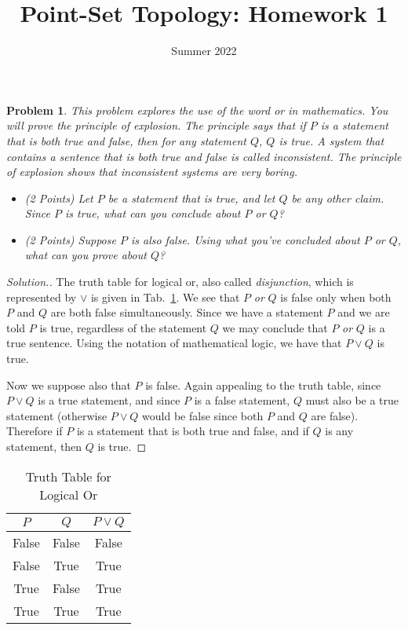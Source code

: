 \documentclass{article}
\title{Point-Set Topology: Homework 1}
\date{Summer 2022}
\theoremstyle{normal}
\newtheorem{problem}{Problem}
\begin{document}
    \maketitle
    \color{blue}
    \begin{problem}
        This problem explores the use of the word \textit{or} in mathematics.
        You will prove the \textit{principle of explosion}. The principle says
        that if $P$ is a statement that is both true and false, then for any
        statement $Q$, $Q$ is true. A system that contains a sentence that is
        both true and false is called \textit{inconsistent}. The principle of
        explosion shows that inconsistent systems are very boring.
        \begin{itemize}
            \item (2 Points) Let $P$ be a statement that is true, and let $Q$
                be any other claim. Since $P$ is true, what can you conclude
                about $P$ \textit{or} $Q$?
            \item (2 Points) Suppose $P$ is also false. Using what you've
                concluded about $P$ \textit{or} $Q$, what can you prove about
                $Q$?
        \end{itemize}
    \end{problem}
    \color{black}
    \begin{proof}[Solution.]
        The truth table for logical or, also called \textit{disjunction},
        which is represented by $\lor$ is given in
        Tab.~\ref{tab:logical_or}. We see that
        $P$ \textit{or} $Q$ is false only when both $P$ and $Q$ are both
        false simultaneously. Since we have a statement $P$ and we are told
        $P$ is true, regardless of the statement $Q$ we may conclude that
        $P$ \textit{or} $Q$ is a true sentence. Using the notation of
        mathematical logic, we have that $P\lor{Q}$ is true.
        \par\hfill\par
        Now we suppose also that $P$ is false. Again appealing to the truth
        table, since $P\lor{Q}$ is a true statement, and since $P$ is a false
        statement, $Q$ must also be a true statement (otherwise
        $P\lor{Q}$ would be false since both $P$ and $Q$ are false). Therefore
        if $P$ is a statement that is both true and false, and if $Q$ is any
        statement, then $Q$ is true.
    \end{proof}
    \begin{table}
        \centering
        \begin{tabular}{ c | c | c }
            $P$&$Q$&$P\lor{Q}$\\
            \hline
            False&False&False\\
            False&True&True\\
            True&False&True\\
            True&True&True
        \end{tabular}
        \caption{Truth Table for Logical Or}
        \label{tab:logical_or}
    \end{table}
\end{document}
